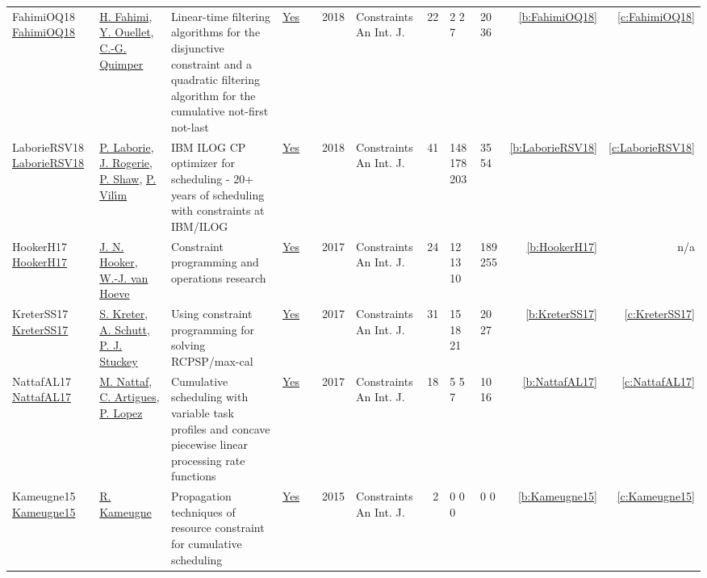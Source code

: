 {\begin{longtable}{>{\raggedright\arraybackslash}p{3cm}>{\raggedright\arraybackslash}p{4.5cm}>{\raggedright\arraybackslash}p{6.0cm}rrrp{2.5cm}rp{1cm}p{1cm}rr}
FahimiOQ18 \href{https://doi.org/10.1007/s10601-018-9282-9}{FahimiOQ18} & \hyperref[auth:a122]{H. Fahimi}, \hyperref[auth:a52]{Y. Ouellet}, \hyperref[auth:a37]{C.-G. Quimper} & Linear-time filtering algorithms for the disjunctive constraint and a quadratic filtering algorithm for the cumulative not-first not-last & \href{../works/FahimiOQ18.pdf}{Yes} & \cite{FahimiOQ18} & 2018 & Constraints An Int. J. & 22 & 2 2 7 & 20 36 & \ref{b:FahimiOQ18} & \ref{c:FahimiOQ18}\\
LaborieRSV18 \href{https://doi.org/10.1007/s10601-018-9281-x}{LaborieRSV18} & \hyperref[auth:a118]{P. Laborie}, \hyperref[auth:a119]{J. Rogerie}, \hyperref[auth:a120]{P. Shaw}, \hyperref[auth:a121]{P. Vil{\'{\i}}m} & {IBM} {ILOG} {CP} optimizer for scheduling - 20+ years of scheduling with constraints at {IBM/ILOG} & \href{../works/LaborieRSV18.pdf}{Yes} & \cite{LaborieRSV18} & 2018 & Constraints An Int. J. & 41 & 148 178 203 & 35 54 & \ref{b:LaborieRSV18} & \ref{c:LaborieRSV18}\\
HookerH17 \href{http://dx.doi.org/10.1007/s10601-017-9280-3}{HookerH17} & \hyperref[auth:a160]{J. N. Hooker}, \hyperref[auth:a206]{W.-J. van Hoeve} & Constraint programming and operations research & \href{../works/HookerH17.pdf}{Yes} & \cite{HookerH17} & 2017 & Constraints An Int. J. & 24 & 12 13 10 & 189 255 & \ref{b:HookerH17} & n/a\\
KreterSS17 \href{https://doi.org/10.1007/s10601-016-9266-6}{KreterSS17} & \hyperref[auth:a123]{S. Kreter}, \hyperref[auth:a124]{A. Schutt}, \hyperref[auth:a125]{P. J. Stuckey} & Using constraint programming for solving RCPSP/max-cal & \href{../works/KreterSS17.pdf}{Yes} & \cite{KreterSS17} & 2017 & Constraints An Int. J. & 31 & 15 18 21 & 20 27 & \ref{b:KreterSS17} & \ref{c:KreterSS17}\\
NattafAL17 \href{https://doi.org/10.1007/s10601-017-9271-4}{NattafAL17} & \hyperref[auth:a81]{M. Nattaf}, \hyperref[auth:a6]{C. Artigues}, \hyperref[auth:a3]{P. Lopez} & \cellcolor{green!10}Cumulative scheduling with variable task profiles and concave piecewise linear processing rate functions & \href{../works/NattafAL17.pdf}{Yes} & \cite{NattafAL17} & 2017 & Constraints An Int. J. & 18 & 5 5 7 & 10 16 & \ref{b:NattafAL17} & \ref{c:NattafAL17}\\
Kameugne15 \href{https://doi.org/10.1007/s10601-015-9227-5}{Kameugne15} & \hyperref[auth:a10]{R. Kameugne} & Propagation techniques of resource constraint for cumulative scheduling & \href{../works/Kameugne15.pdf}{Yes} & \cite{Kameugne15} & 2015 & Constraints An Int. J. & 2 & 0 0 0 & 0 0 & \ref{b:Kameugne15} & \ref{c:Kameugne15}\\

\end{longtable}}
